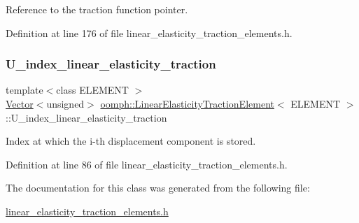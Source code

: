 Reference to the traction function pointer. 



Definition at line 176 of file linear\+\_\+elasticity\+\_\+traction\+\_\+elements.\+h.

\mbox{\label{classoomph_1_1LinearElasticityTractionElement_ad3a514b2ac65ab9cba87192ec274bc45}} 
\subsubsection{\texorpdfstring{U\+\_\+index\+\_\+linear\+\_\+elasticity\+\_\+traction}{U\_index\_linear\_elasticity\_traction}}
{\footnotesize\ttfamily template$<$class E\+L\+E\+M\+E\+NT $>$ \\
\hyperlink{classoomph_1_1Vector}{Vector}$<$unsigned$>$ \hyperlink{classoomph_1_1LinearElasticityTractionElement}{oomph\+::\+Linear\+Elasticity\+Traction\+Element}$<$ E\+L\+E\+M\+E\+NT $>$\+::U\+\_\+index\+\_\+linear\+\_\+elasticity\+\_\+traction\hspace{0.3cm}{\ttfamily [protected]}}



Index at which the i-\/th displacement component is stored. 



Definition at line 86 of file linear\+\_\+elasticity\+\_\+traction\+\_\+elements.\+h.



The documentation for this class was generated from the following file\+:\begin{DoxyCompactItemize}
\item 
\hyperlink{linear__elasticity__traction__elements_8h}{linear\+\_\+elasticity\+\_\+traction\+\_\+elements.\+h}\end{DoxyCompactItemize}
